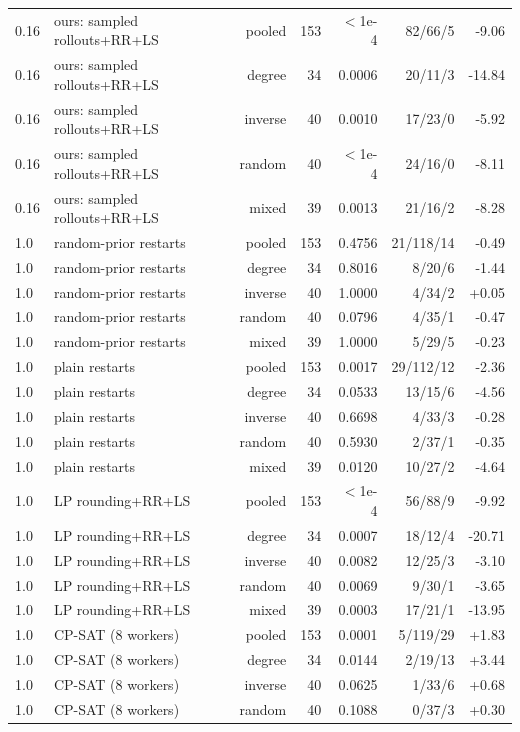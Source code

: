 \begin{table}[t]
\begin{tabular}{llrrrrr}
0.16 & ours: sampled rollouts+RR+LS & pooled & 153 & $<$1e-4 & 82/66/5 & -9.06 \\
0.16 & ours: sampled rollouts+RR+LS & degree & 34 & 0.0006 & 20/11/3 & -14.84 \\
0.16 & ours: sampled rollouts+RR+LS & inverse & 40 & 0.0010 & 17/23/0 & -5.92 \\
0.16 & ours: sampled rollouts+RR+LS & random & 40 & $<$1e-4 & 24/16/0 & -8.11 \\
0.16 & ours: sampled rollouts+RR+LS & mixed & 39 & 0.0013 & 21/16/2 & -8.28 \\
1.0 & random-prior restarts & pooled & 153 & 0.4756 & 21/118/14 & -0.49 \\
1.0 & random-prior restarts & degree & 34 & 0.8016 & 8/20/6 & -1.44 \\
1.0 & random-prior restarts & inverse & 40 & 1.0000 & 4/34/2 & +0.05 \\
1.0 & random-prior restarts & random & 40 & 0.0796 & 4/35/1 & -0.47 \\
1.0 & random-prior restarts & mixed & 39 & 1.0000 & 5/29/5 & -0.23 \\
1.0 & plain restarts & pooled & 153 & 0.0017 & 29/112/12 & -2.36 \\
1.0 & plain restarts & degree & 34 & 0.0533 & 13/15/6 & -4.56 \\
1.0 & plain restarts & inverse & 40 & 0.6698 & 4/33/3 & -0.28 \\
1.0 & plain restarts & random & 40 & 0.5930 & 2/37/1 & -0.35 \\
1.0 & plain restarts & mixed & 39 & 0.0120 & 10/27/2 & -4.64 \\
1.0 & LP rounding+RR+LS & pooled & 153 & $<$1e-4 & 56/88/9 & -9.92 \\
1.0 & LP rounding+RR+LS & degree & 34 & 0.0007 & 18/12/4 & -20.71 \\
1.0 & LP rounding+RR+LS & inverse & 40 & 0.0082 & 12/25/3 & -3.10 \\
1.0 & LP rounding+RR+LS & random & 40 & 0.0069 & 9/30/1 & -3.65 \\
1.0 & LP rounding+RR+LS & mixed & 39 & 0.0003 & 17/21/1 & -13.95 \\
1.0 & CP-SAT (8 workers) & pooled & 153 & 0.0001 & 5/119/29 & +1.83 \\
1.0 & CP-SAT (8 workers) & degree & 34 & 0.0144 & 2/19/13 & +3.44 \\
1.0 & CP-SAT (8 workers) & inverse & 40 & 0.0625 & 1/33/6 & +0.68 \\
1.0 & CP-SAT (8 workers) & random & 40 & 0.1088 & 0/37/3 & +0.30 \\

\end{tabular}
\end{table}
